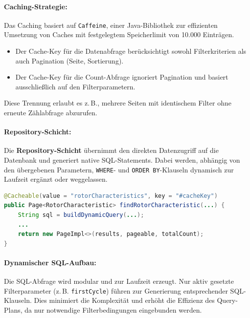 \documentclass[12pt, ngerman, a4paper, numbers=noenddot]{article}
\begin{document}
\paragraph{Caching-Strategie:}

Das Caching basiert auf \lstinline|Caffeine|, einer Java-Bibliothek zur effizienten Umsetzung von Caches mit festgelegtem Speicherlimit von 10.000 Einträgen.

\begin{itemize}
	\item Der Cache-Key für die Datenabfrage berücksichtigt sowohl Filterkriterien als auch Pagination (Seite, Sortierung).
	\item Der Cache-Key für die Count-Abfrage ignoriert Pagination und basiert ausschließlich auf den Filterparametern.
\end{itemize}

Diese Trennung erlaubt es z.\,B., mehrere Seiten mit identischem Filter ohne erneute Zählabfrage abzurufen.

\paragraph{Repository-Schicht:}

Die \textbf{Repository-Schicht} übernimmt den direkten Datenzugriff auf die Datenbank und generiert native SQL\hyp{}Statements. Dabei werden, abhängig von den übergebenen Parametern, \lstinline|WHERE|- und \lstinline|ORDER BY|-Klauseln dynamisch zur Laufzeit ergänzt oder weggelassen.

\begin{lstlisting}[language=java, caption=Datenabfrage-Methode (vereinfacht), label=lst:repo-method]
@Cacheable(value = "rotorCharacteristics", key = "#cacheKey")
public Page<RotorCharacteristic> findRotorCharacteristic(...) {
	String sql = buildDynamicQuery(...);
	...
	return new PageImpl<>(results, pageable, totalCount);
}
\end{lstlisting}

\paragraph{Dynamischer SQL-Aufbau:}

Die SQL-Abfrage wird modular und zur Laufzeit erzeugt. Nur aktiv gesetzte Filterparameter (z.\,B. \lstinline|firstCycle|) führen zur Generierung entsprechender SQL-Klauseln. Dies minimiert die Komplexität und erhöht die Effizienz des Query-Plans, da nur notwendige Filterbedingungen eingebunden werden.
\end{document}
